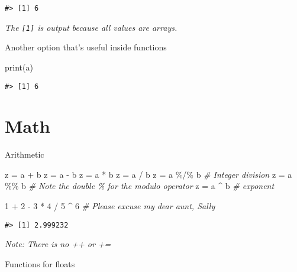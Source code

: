 \documentclass[
]{book}
\newenvironment{Shaded}{\begin{snugshade}}{\end{snugshade}}
\newcommand{\CommentTok}[1]{\textcolor[rgb]{0.56,0.35,0.01}{\textit{#1}}}
\newcommand{\DecValTok}[1]{\textcolor[rgb]{0.00,0.00,0.81}{#1}}
\newcommand{\FunctionTok}[1]{\textcolor[rgb]{0.00,0.00,0.00}{#1}}
\newcommand{\NormalTok}[1]{#1}
\newcommand{\OtherTok}[1]{\textcolor[rgb]{0.56,0.35,0.01}{#1}}
\newcommand{\SpecialCharTok}[1]{\textcolor[rgb]{0.00,0.00,0.00}{#1}}
\begin{document}
\begin{verbatim}
#> [1] 6
\end{verbatim}

\emph{The \texttt{{[}1{]}} is output because all values are arrays.}

Another option that's useful inside functions

\begin{Shaded}
\begin{Highlighting}[]
\FunctionTok{print}\NormalTok{(a)}
\end{Highlighting}
\end{Shaded}

\begin{verbatim}
#> [1] 6
\end{verbatim}

\hypertarget{math}{%
\section{Math}\label{math}}

Arithmetic

\begin{Shaded}
\begin{Highlighting}[]
\NormalTok{z }\OtherTok{=}\NormalTok{ a }\SpecialCharTok{+}\NormalTok{ b}
\NormalTok{z }\OtherTok{=}\NormalTok{ a }\SpecialCharTok{{-}}\NormalTok{ b}
\NormalTok{z }\OtherTok{=}\NormalTok{ a }\SpecialCharTok{*}\NormalTok{ b}
\NormalTok{z }\OtherTok{=}\NormalTok{ a }\SpecialCharTok{/}\NormalTok{ b}
\NormalTok{z }\OtherTok{=}\NormalTok{ a }\SpecialCharTok{\%/\%}\NormalTok{ b }\CommentTok{\# Integer division}
\NormalTok{z }\OtherTok{=}\NormalTok{ a }\SpecialCharTok{\%\%}\NormalTok{ b }\CommentTok{\# Note the double \% for the modulo operator}
\NormalTok{z }\OtherTok{=}\NormalTok{ a }\SpecialCharTok{\^{}}\NormalTok{ b }\CommentTok{\# exponent}

\DecValTok{1} \SpecialCharTok{+} \DecValTok{2} \SpecialCharTok{{-}} \DecValTok{3} \SpecialCharTok{*} \DecValTok{4} \SpecialCharTok{/} \DecValTok{5} \SpecialCharTok{\^{}} \DecValTok{6} \CommentTok{\# Please excuse my dear aunt, Sally}
\end{Highlighting}
\end{Shaded}

\begin{verbatim}
#> [1] 2.999232
\end{verbatim}

\emph{Note: There is no ++ or +=}

Functions for floats
\end{document}
